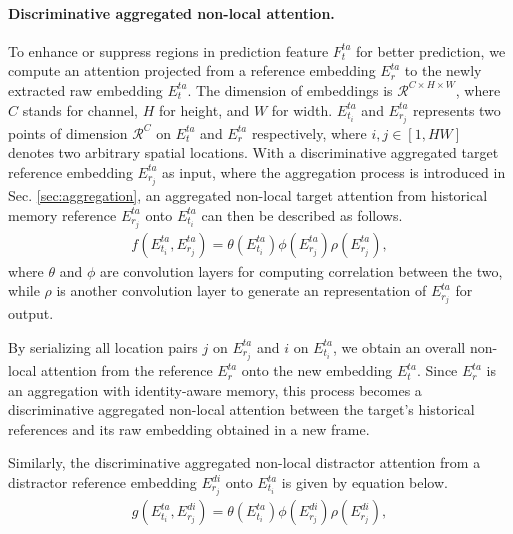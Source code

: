 \documentclass[final]{cvpr}
\begin{document}
\paragraph{Discriminative aggregated non-local attention.}
To enhance or suppress regions in prediction feature \(F^{ta}_t\) for better prediction, we compute an attention projected from a reference embedding \(E^{ta}_r\) to the newly extracted raw embedding \(E^{ta}_t\). The dimension of embeddings is \(\mathcal{R}^{C \times H \times W}\), where \(C\) stands for channel, \(H\) for height, and \(W\) for width. \(E^{ta}_{t_i}\) and \(E^{ta}_{r_j}\) represents two points of dimension \(\mathcal{R}^{C}\) on \(E^{ta}_t\) and \(E^{ta}_r\) respectively, where \(i, j \in [1, HW]\) denotes two arbitrary spatial locations. With a discriminative aggregated target reference embedding \(E^{ta}_{r_j}\) as input, where the aggregation process is introduced in Sec. \ref{sec:aggregation}, an aggregated non-local target attention from historical memory reference \(E^{ta}_{r_j}\) onto \(E^{ta}_{t_i}\) can then be described as follows.
\begin{align}
  f(E^{ta}_{t_i}, E^{ta}_{r_j}) = \theta(E^{ta}_{t_i}) \phi(E^{ta}_{r_j}) \rho(E^{ta}_{r_j}),
  \label{eq:nonlocal target}
\end{align}
where \(\theta\) and \(\phi\) are convolution layers for computing correlation between the two, while \(\rho\) is another convolution layer to generate an representation of \(E^{ta}_{r_j}\) for output.

By serializing all location pairs \(j\) on \(E^{ta}_{r_j}\) and \(i\) on \(E^{ta}_{t_i}\), we obtain an overall non-local attention from the reference \(E^{ta}_r\) onto the new embedding \(E^{ta}_t\). Since \(E^{ta}_r\) is an aggregation with identity-aware memory, this process becomes a discriminative aggregated non-local attention between the target's historical references and its raw embedding obtained in a new frame.

Similarly, the discriminative aggregated non-local distractor attention from a distractor reference embedding \(E^{di}_{r_j}\) onto \(E^{ta}_{t_i}\) is given by equation below.
\begin{align}
  g(E^{ta}_{t_i}, E^{di}_{r_j}) = \theta(E^{ta}_{t_i}) \phi(E^{di}_{r_j}) \rho(E^{di}_{r_j}),
  \label{eq:nonlocal distractor}
\end{align}
\end{document}
